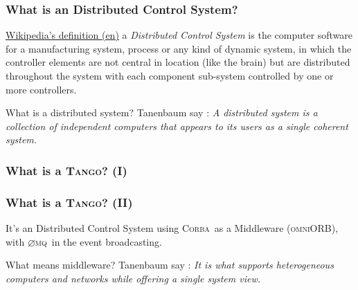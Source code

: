 \documentclass{beamer}
\newcommand{\tango}{\textsc{Tango}}
\newcommand{\corba}{\textsc{Corba}}
\newcommand{\onmiORB}{\textsc{omniORB}}
\newcommand{\zmq}{\textsc{$\varnothing$mq}}
\begin{document}
\begin{frame}
\frametitle{What is an Distributed Control System?}
    \begin{block}{\href{http://en.wikipedia.org/wiki/Distributed_control_system}{Wikipedia's definition (en)}}
        a \emph{Distributed Control System} is the computer software for a manufacturing system, process or any kind of dynamic system, in which the controller elements are not central in location (like the brain) but are distributed throughout the system with each component sub-system controlled by one or more controllers.
    \end{block}
    \begin{block}{What is a distributed system?}
        Tanenbaum say \cite{TanenbaumDistr}: \emph{A distributed system is a collection of independent computers that appears to its users as a single coherent system.}
    \end{block}
\end{frame}

\begin{frame}
\frametitle{What is a \tango? (I)}
    \begin{figure}[h]
    \end{figure}
\end{frame}

\begin{frame}
\frametitle{What is a \tango? (II)}
    \begin{block}{It's an Distributed Control System}
        using \corba\, as a Middleware (\onmiORB),\\ with \zmq\, in the event broadcasting.
    \end{block}
    \begin{block}{What means middleware?}
        Tanenbaum say \cite{TanenbaumDistr}: \emph{It is what supports heterogeneous computers and networks while offering a single system view.}
    \end{block}
\end{frame}
\end{document}
